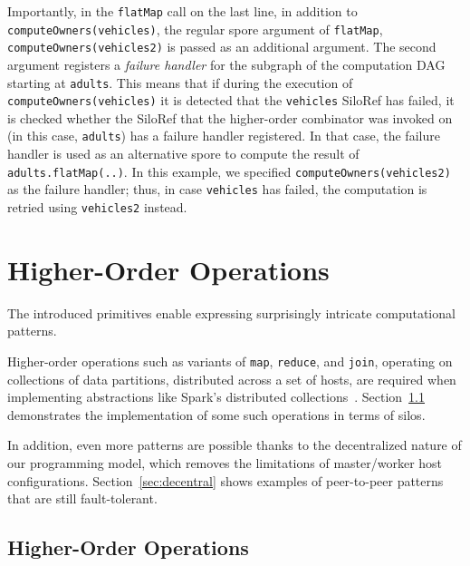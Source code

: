 \documentclass[preprint]{sigplanconf}
\theoremstyle{definition}
\theoremstyle{definition}
\begin{document}
Importantly, in the \verb|flatMap| call on the last line, in addition to
\verb|computeOwners(vehicles)|, the regular spore argument of \verb|flatMap|,
\verb|computeOwners(vehicles2)| is passed as an additional argument. The second
argument registers a \emph{failure handler} for the subgraph of the computation
DAG starting at \verb|adults|. This means that if during the execution of
\verb|computeOwners(vehicles)| it is detected that the \verb|vehicles| SiloRef
has failed, it is checked whether the SiloRef that the higher-order combinator
was invoked on (in this case, \verb|adults|) has a failure handler registered.
In that case, the failure handler is used as an alternative spore to compute
the result of \verb|adults.flatMap(..)|. In this example, we specified
\verb|computeOwners(vehicles2)| as the failure handler; thus, in case
\verb|vehicles| has failed, the computation is retried using \verb|vehicles2|
instead.

\section{Higher-Order Operations}
\label{sec:higher-order-operations}

The introduced primitives enable expressing surprisingly intricate
computational patterns.

Higher-order operations such as variants of \verb|map|, \verb|reduce|, and
\verb|join|, operating on collections of data partitions, distributed across a
set of hosts, are required when implementing abstractions like Spark's
distributed collections~\cite{Spark}. Section~\ref{sec:dist-coll} demonstrates
the implementation of some such operations in terms of silos.

In addition, even more patterns are possible thanks to the decentralized nature
of our programming model, which removes the limitations of master/worker host
configurations. Section~\ref{sec:decentral} shows examples of peer-to-peer
patterns that are still fault-tolerant.


\subsection{Higher-Order Operations}
\label{sec:dist-coll}

%
\end{document}
